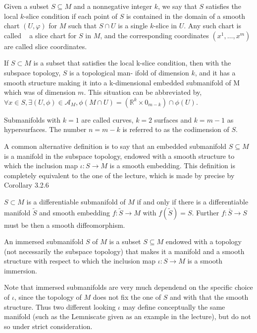 Given a subset \(S \subseteq M\) and a nonnegative integer \(k\), we say that \(S\) satisfies the local \(k\)-slice condition if each point of \(S\) is contained in the domain of a smooth chart \((U, \varphi)\) for \(M\) such that \(S \cap U\) is a single \(k\)-slice in \(U\). Any such chart is called   
a slice chart for \(S\) in \(M\), and the corresponding coordinates \((x^1, \dots, x^m)\) are called slice coordinates.

If \( S \subset M \) is a subset that satisfies the local k-slice condition, then with the subspace topology, \( S \) is a topological man-
ifold of dimension \( k \), and it has a smooth structure making it into a k-dimensional embedded submanifold of M which was of dimension \( m \).
This situation can be abbreviated by, \( \forall x \in S, \exists (U, \phi) \in \mathcal{A}_M, \phi(M \cap U) = (\mathbb{R}^k \times 0_{m-k}) \cap \phi(U) \).

Submanifolds with \( k=1 \) are called curves, \( k=2 \) surfaces and \( k = m - 1 \) as hypersurfaces. The number \( n = m - k \) is referred to as the codimension of \( S \).

A common alternative definition is to say that an embedded submanifold \( S \subseteq M \) is a manifold in the subspace topology, endowed with a smooth
structure to which the inclusion map \( \iota : S \to M \) is a smooth embedding. 
This definition is completely equivalent to the one of the lecture, which is made by precise by Corollary 3.2.6

\( S \subset M \) is a differentiable submanifold of \( M \) if and only if there is a differentiable manifold \( \tilde{S} \) and smooth embedding
\( f : \tilde{S} \to M \) with \( f(\tilde{S}) = S \). Further \( f : \bar{S} \to S \) must be then a smooth diffeomorphism.

An immersed submanifold \( S \) of \( M \) is a subset \( S \subseteq M \) endowed with a topology (not necessarily the subspace topology)
that makes it a manifold and a smooth structure with respect to which the inclusion map \( \iota : S \to M\) is a smooth immersion.

Note that immersed submanifolds are very much dependend on the specific choice of \( \iota \), since the topology of \( M \) does not fix the one of \( S \)
and with that the smooth structure. Thus two different looking \( \iota \) may define conceptually the same manifold (such as the Lemniscate given as an example in the lecture), but do not so under strict consideration.


